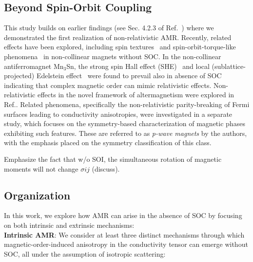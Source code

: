 \documentclass[prb,showpacs,amsmath,amssymb,superscriptaddress,twocolumn,floatfix]{revtex4-1}
\begin{document}
\subsection{Beyond Spin-Orbit Coupling}

This study builds on earlier findings (see Sec. 4.2.3 of Ref.~\cite{Ritzinger:2023}) where we demonstrated the first realization of non-relativistic AMR. Recently, related effects have been explored, including spin textures~\cite{Bonbien:2022} and spin-orbit-torque-like phenomena~\cite{Gonzalez-Hernandez:2024} in non-collinear magnets without SOC. In the non-collinear antiferromagnet Mn$_3$Sn, the strong spin Hall effect (SHE)~\cite{Zhou:2020, Zhang:2017} and local (sublattice-projected) Edelstein effect~\cite{Gonzalez-Hernandez:2024} were found to prevail also in absence of SOC~\cite{Manna:2018, Gonzalez-Hernandez:2024} indicating that complex magnetic order can mimic relativistic effects. Non-relativistic effects in the novel framework of altermagnetism were explored in Ref.\cite{Jungwirth:2024}. Related phenomena, specifically the non-relativistic parity-breaking of Fermi surfaces leading to conductivity anisotropies, were investigated in a separate study\cite{BirkHellens:2023}, which focuses on the symmetry-based characterization of magnetic phases exhibiting such features. These are referred to as \textit{p-wave magnets} by the authors, with the emphasis placed on the symmetry classification of this class.

{\color{red} Emphasize the fact that w/o SOI, the simultaneous
  rotation of magnetic moments will not change $\sigma{ij}$ (discuss).}

\subsection{Organization}

In this work, we explore how AMR can arise in the absence of SOC by focusing on both intrinsic and extrinsic mechanisms: \\

	
\textbf{Intrinsic AMR}: {\color{blue} We consider} at least three distinct mechanisms through which magnetic-order-induced anisotropy in the conductivity tensor can emerge without SOC, all under the assumption of isotropic scattering:
	
\end{document}

